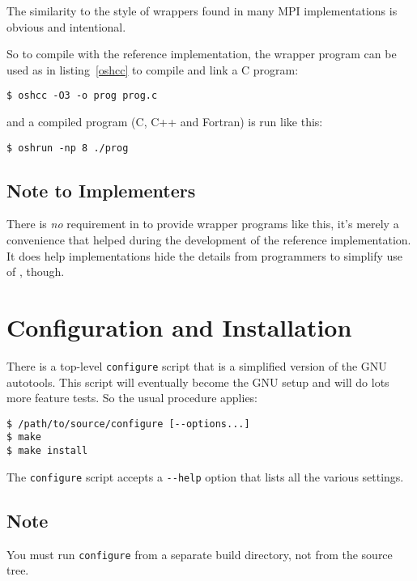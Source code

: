 The similarity to the style of wrappers found in many MPI
implementations is obvious and intentional.

So to compile with the reference implementation, the wrapper program
can be used as in listing~\ref{oshcc} to compile and link a C program:

\begin{lstlisting}[numbers=none,label=oshcc,caption={Compiling and Linking C with the \openshmem Reference Implementation}]
$ oshcc -O3 -o prog prog.c
\end{lstlisting}

and a compiled program (C, C++ and Fortran) is run like this:

\begin{lstlisting}[label=oshrun,caption={Running a program on 8 processors with the \openshmem Reference Implementation}]
$ oshrun -np 8 ./prog
\end{lstlisting}

\subsection*{Note to Implementers}

There is \emph{no} requirement in \openshmem to provide wrapper
programs like this, it's merely a convenience that helped during the
development of the reference implementation.  It does help
implementations hide the details from programmers to simplify use of
\openshmem, though.

\section{Configuration and Installation}

There is a top-level \texttt{configure} script that is a simplified
version of the GNU autotools. This script will eventually become the
GNU setup and will do lots more feature tests. So the usual procedure
applies:

\begin{lstlisting}
$ /path/to/source/configure [--options...]
$ make
$ make install
\end{lstlisting}

The \texttt{configure} script accepts a
\texttt{-{}-help} option that lists all the various settings.

\subsection*{Note}
You must run \texttt{configure} from a separate build directory, not
from the source tree.

